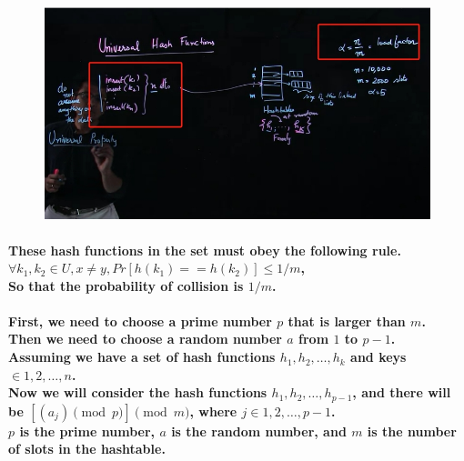 \documentclass{article}
\begin{document}
\begin{figure}[H]
    \includegraphics[width=\textwidth]{loadfactor.png}
\end{figure}

\paragraph{These hash functions in the set must obey the following rule.\\
$\forall k_1,k_2 \in U, x \neq y, Pr[h(k_1) == h(k_2)] \leq 1/m$,\\
So that the probability of collision is $1/m$.\\
}

\paragraph{First, we need to choose a prime number $p$ that is larger than $m$.\\
Then we need to choose a random number $a$ from $1$ to $p-1$.\\
Assuming we have a set of hash functions ${h_1,h_2, \ldots ,h_k}$ and keys $\in {1,2, \ldots, n}$.\\
Now we will consider the hash functions $h_1,h_2, \ldots,h_{p-1}$, and there will be $[(a_j) \pmod p] \pmod m$, 
where $j \in {1,2, \ldots, p-1}$.\\
$p$ is the prime number, $a$ is the random number, and $m$ is the number of slots in the hashtable.\\}
\end{document}
